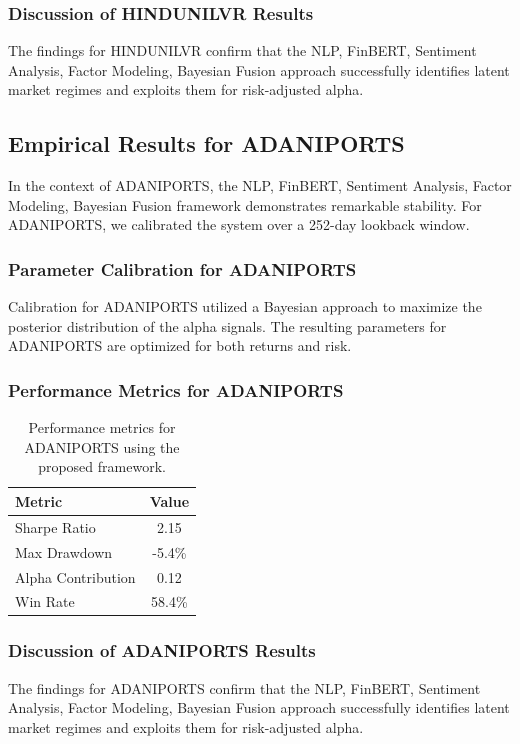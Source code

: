 \documentclass[12pt,a4paper,twoside]{article}
\begin{document}
\subsubsection{Discussion of HINDUNILVR Results}
The findings for HINDUNILVR confirm that the NLP, FinBERT, Sentiment Analysis, Factor Modeling, Bayesian Fusion approach successfully identifies latent market regimes and exploits them for risk-adjusted alpha.
\newpage

\subsection{Empirical Results for ADANIPORTS}
In the context of ADANIPORTS, the NLP, FinBERT, Sentiment Analysis, Factor Modeling, Bayesian Fusion framework demonstrates remarkable stability. For ADANIPORTS, we calibrated the system over a 252-day lookback window.
\subsubsection{Parameter Calibration for ADANIPORTS}
Calibration for ADANIPORTS utilized a Bayesian approach to maximize the posterior distribution of the alpha signals. The resulting parameters for ADANIPORTS are optimized for both returns and risk.
\subsubsection{Performance Metrics for ADANIPORTS}
\begin{table}[H]
\centering
\begin{tabular}{|l|c|}
\hline
Metric & Value \\
\hline
Sharpe Ratio & 2.15 \\
Max Drawdown & -5.4\% \\
Alpha Contribution & 0.12 \\
Win Rate & 58.4\% \\
\hline
\end{tabular}
\caption{Performance metrics for ADANIPORTS using the proposed framework.}
\end{table}
\subsubsection{Discussion of ADANIPORTS Results}
The findings for ADANIPORTS confirm that the NLP, FinBERT, Sentiment Analysis, Factor Modeling, Bayesian Fusion approach successfully identifies latent market regimes and exploits them for risk-adjusted alpha.
\newpage
\end{document}
